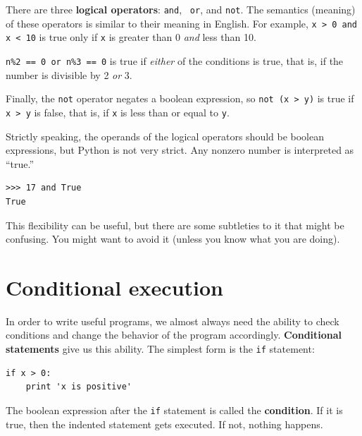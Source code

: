 \documentclass[10pt]{book}
\begin{document}
There are three {\bf logical operators}: {\tt and}, {\tt
or}, and {\tt not}.  The semantics (meaning) of these operators is
similar to their meaning in English.  For example,
{\tt x > 0 and x < 10} is true only if {\tt x} is greater than 0
{\em and} less than 10.


{\tt n\%2 == 0 or n\%3 == 0} is true if {\em either} of the conditions
is true, that is, if the number is divisible by 2 {\em or} 3.

Finally, the {\tt not} operator negates a boolean
expression, so {\tt not (x > y)} is true if {\tt x > y} is false,
that is, if {\tt x} is less than or equal to {\tt y}.

Strictly speaking, the operands of the logical operators should be
boolean expressions, but Python is not very strict.
Any nonzero number is interpreted as ``true.''

\beforeverb
\begin{verbatim}
>>> 17 and True
True
\end{verbatim}
\afterverb
%
This flexibility can be useful, but there are some subtleties to
it that might be confusing.  You might want to avoid it (unless
you know what you are doing).

\section{Conditional execution}
\label{conditional execution}


In order to write useful programs, we almost always need the ability
to check conditions and change the behavior of the program
accordingly.  {\bf Conditional statements} give us this ability.  The
simplest form is the {\tt if} statement:

\beforeverb
\begin{verbatim}
if x > 0:
    print 'x is positive'
\end{verbatim}
\afterverb
%
The boolean expression after the {\tt if} statement is
called the {\bf condition}.  If it is true, then the indented
statement gets executed.  If not, nothing happens.

\end{document}
